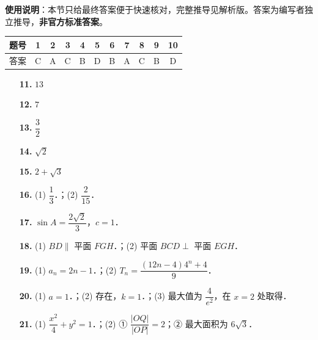 
\begin{gknotice}
\textbf{使用说明}：本节只给最终答案便于快速核对，完整推导见解析版。答案为编写者独立推导，\textbf{非官方标准答案}。
\end{gknotice}

\begin{center}\begin{tabular}{ccccccccccc}
\toprule
题号 & 1 & 2 & 3 & 4 & 5 & 6 & 7 & 8 & 9 & 10 \\
\midrule
答案 & C & A & C & B & D & B & A & C & B & D \\
\bottomrule
\end{tabular}\end{center}

\begin{itemize}[leftmargin=2.6em]
  \item[\textbf{11.}] \(13\)
  \item[\textbf{12.}] \(7\)
  \item[\textbf{13.}] \(\dfrac32\)
  \item[\textbf{14.}] \(\sqrt2\)
  \item[\textbf{15.}] \(2+\sqrt3\)
\end{itemize}

\begin{itemize}[leftmargin=2.6em]
  \item[\textbf{16.}] (1) \(\dfrac13\)．；(2) \(\dfrac2{15}\)．
  \item[\textbf{17.}] \(\sin A=\dfrac{2\sqrt2}{3}\)，\(c=1\)．
  \item[\textbf{18.}] (1) \(BD\parallel\) 平面 \(FGH\)．；(2) 平面 \(BCD\perp\) 平面 \(EGH\)．
  \item[\textbf{19.}] (1) \(a_n=2n-1\)．；(2) \(T_n=\dfrac{(12n-4)4^n+4}{9}\)．
  \item[\textbf{20.}] (1) \(a=1\)．；(2) 存在，\(k=1\)．；(3) 最大值为 \(\dfrac4{e^2}\)，在 \(x=2\) 处取得．
  \item[\textbf{21.}] (1) \(\dfrac{x^2}{4}+y^2=1\)．；(2) ① \(\dfrac{|OQ|}{|OP|}=2\)；② 最大面积为 \(6\sqrt3\)．
\end{itemize}
